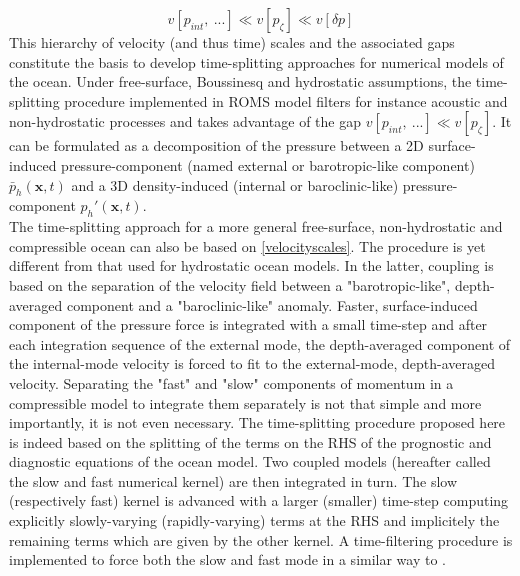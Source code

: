 \begin{equation}
	\displaystyle
	\label{velocityscales}
	v[p_{int},\ ...] \ll v[p_\zeta] \ll v[\delta p]
\end{equation} 
This hierarchy of velocity (and thus time) scales and the associated gaps constitute the basis to develop time-splitting approaches for numerical models of the ocean.
Under free-surface, Boussinesq and hydrostatic assumptions, the time-splitting procedure implemented in ROMS model \citep{shchepetkin_regional_2005} filters for instance acoustic and non-hydrostatic processes and takes advantage of the gap $v[p_{int},\ ...] \ll v[p_\zeta]$. It can be formulated as a decomposition of the pressure between a 2D surface-induced pressure-component (named external or barotropic-like component) $\bar{p}_h(\mathbf{x},t)$ and a 3D density-induced (internal or baroclinic-like) pressure-component $p_h'(\mathbf{x},t)$. \\
The time-splitting approach for a more general free-surface, non-hydrostatic and compressible ocean can also be based on \ref{velocityscales}. The procedure is yet different from that used for hydrostatic ocean models. In the latter, coupling is based on the separation of the velocity field between a "barotropic-like", depth-averaged component and a "baroclinic-like" anomaly. Faster, surface-induced component of the pressure force is integrated with a small time-step and after each integration sequence of the external mode, the depth-averaged component of the internal-mode velocity is forced to fit to the external-mode, depth-averaged velocity. Separating the "fast" and "slow" components of momentum in a compressible model to integrate them separately is not that simple and more importantly, it is not even necessary. The time-splitting procedure proposed here is indeed based on the splitting of the terms on the RHS of the prognostic and diagnostic equations of the ocean model. Two coupled models (hereafter called the slow and fast numerical kernel) are then integrated in turn. The slow (respectively fast) kernel is advanced with a larger (smaller) time-step computing explicitly slowly-varying (rapidly-varying) terms at the RHS and implicitely the remaining terms which are given by the other kernel. A time-filtering procedure is implemented to force both the slow and fast mode in a similar way to \cite{shchepetkin_regional_2005}.

